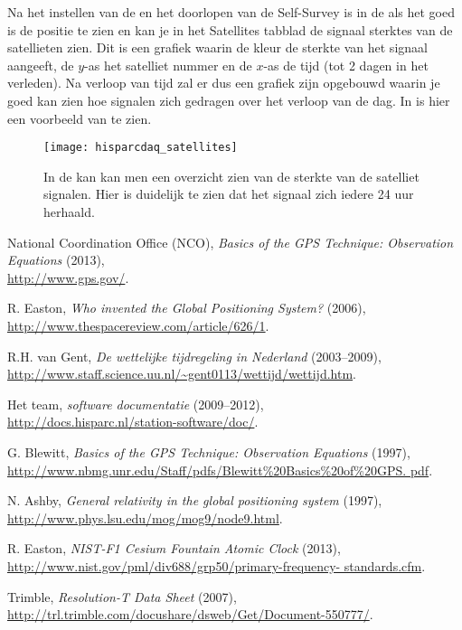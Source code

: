 Na het instellen van de \gps en het doorlopen van de Self-Survey is in
de \hisparc \daq als het goed is de \gps positie te zien en kan je in
het Satellites tabblad de signaal sterktes van de satellieten zien. Dit
is een grafiek waarin de kleur de sterkte van het signaal aangeeft, de
$y$-as het satelliet nummer en de $x$-as de tijd (tot 2 dagen in het
verleden). Na verloop van tijd zal er dus een grafiek zijn opgebouwd
waarin je goed kan zien hoe \gps signalen zich gedragen over het verloop
van de dag. In  is hier een voorbeeld
van te zien.

\begin{figure}
    \centering
    \texttt{[image: hisparcdaq\_satellites]}
    \caption{In de \hisparc \daq kan kan men een overzicht zien van de
    sterkte van de satelliet signalen. Hier is duidelijk te zien dat het
    signaal zich iedere 24 uur herhaald.}
    \label{fig:hisparcdaq_satellites}
\end{figure}

\begin{thebibliography}{9}
     National Coordination Office (NCO), \emph{Basics
    of the GPS Technique: Observation Equations} (2013),\\
    \url{http://www.gps.gov/}.

     R. Easton, \emph{Who invented the Global
    Positioning System?} (2006),\\
    \url{http://www.thespacereview.com/article/626/1}.

     R.H. van Gent, \emph{De wettelijke
    tijdregeling in Nederland} (2003--2009),\\
    \url{http://www.staff.science.uu.nl/~gent0113/wettijd/wettijd.htm}.

     Het \hisparc team, \emph{\hisparc
    software documentatie} (2009--2012),\\
    \url{http://docs.hisparc.nl/station-software/doc/}.

     G. Blewitt, \emph{Basics of the GPS
    Technique: Observation Equations} (1997),\\
    \url{http://www.nbmg.unr.edu/Staff/pdfs/Blewitt%
    pdf}.

     N. Ashby, \emph{General relativity in the
    global positioning system} (1997),\\
    \url{http://www.phys.lsu.edu/mog/mog9/node9.html}.

     R. Easton, \emph{NIST-F1 Cesium Fountain
    Atomic Clock} (2013),\\
    \url{http://www.nist.gov/pml/div688/grp50/primary-frequency-
    standards.cfm}.

     Trimble, \emph{Resolution-T Data Sheet}
    (2007),\\
    \url{http://trl.trimble.com/docushare/dsweb/Get/Document-550777/}.
\end{thebibliography}


